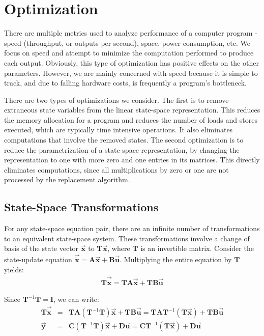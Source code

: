 \section{Optimization}

     There are multiple metrics used to analyze performance
of a computer program - speed (throughput, or outputs per second),
space, power consumption, etc. We focus on speed and attempt to
minimize the computation performed to produce each output.
Obviously, this type of optimization has positive effects on the
other parameters. However, we are mainly concerned with speed
because it is simple to track, and due to falling hardware costs,
is frequently a program's bottleneck.

    There are two types of optimizations we consider.  The first is to
remove extraneous state variables from the linear state-space
representation. This reduces the memory allocation for a program
and reduces the number of loads and stores executed, which are
typically time intensive operations. It also eliminates
computations that involve the removed states.  The second
optimization is to reduce the parametrization of a state-space
representation, by changing the representation to one with more
zero and one entries in its matrices. This directly eliminates
computations, since all multiplications by zero or one are not
processed by the replacement algorithm.

\subsection{State-Space Transformations}

    For any state-space equation pair, there are an infinite
number of transformations to an equivalent state-space system.
These transformations involve a change of basis of the state
vector $\vec{\mathbf{x}}$ to $\mathbf{T} \vec{\mathbf{x}}$, where
$\mathbf{T}$ is an invertible matrix. Consider the state-update
equation $\vec{\dot{\mathbf{x}}} = \mathbf{A} \vec{\mathbf{x}} +
\mathbf{B} \vec{\mathbf{u}}$. Multiplying the entire equation by
$\mathbf{T}$ yields:
\begin{eqnarray*}
\mathbf{T} \vec{\dot{\mathbf{x}}} = \mathbf{TA} \vec{\mathbf{x}} +
\mathbf{TB} \vec{\mathbf{u}}
\end{eqnarray*}

    Since $\mathbf{T}^{-1} \mathbf{T} = \mathbf{I}$, we can write:
\begin{eqnarray*}
\mathbf{T} \vec{\dot{\mathbf{x}}} & = & \mathbf{TA}
(\mathbf{T}^{-1} \mathbf{T}) \vec{\mathbf{x}} + \mathbf{TB}
\vec{\mathbf{u}} = \mathbf{TA}
\mathbf{T}^{-1} (\mathbf{T} \vec{\mathbf{x}}) + \mathbf{TB} \vec{\mathbf{u}} \\
\vec{\mathbf{y}} & = & \mathbf{C} (\mathbf{T}^{-1} \mathbf{T})
\vec{\mathbf{x}} + \mathbf{D} \vec{\mathbf{u}} = \mathbf{C}
\mathbf{T}^{-1} (\mathbf{T} \vec{\mathbf{x}}) + \mathbf{D}
\vec{\mathbf{u}}
\end{eqnarray*}

